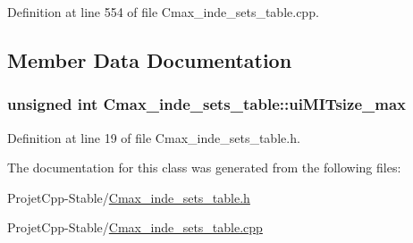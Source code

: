 Definition at line 554 of file Cmax\+\_\+inde\+\_\+sets\+\_\+table.\+cpp.



\subsection{Member Data Documentation}
\hypertarget{class_cmax__inde__sets__table_a9a847269f6dfaca3ce1c292fc31171cf}{}
\subsubsection[{ui\+M\+I\+Tsize\+\_\+max}]{\setlength{\rightskip}{0pt plus 5cm}unsigned int Cmax\+\_\+inde\+\_\+sets\+\_\+table\+::ui\+M\+I\+Tsize\+\_\+max\hspace{0.3cm}{\ttfamily [private]}}\label{class_cmax__inde__sets__table_a9a847269f6dfaca3ce1c292fc31171cf}


Definition at line 19 of file Cmax\+\_\+inde\+\_\+sets\+\_\+table.\+h.



The documentation for this class was generated from the following files\+:\begin{DoxyCompactItemize}
\item 
Projet\+Cpp-\/\+Stable/\hyperlink{_cmax__inde__sets__table_8h}{Cmax\+\_\+inde\+\_\+sets\+\_\+table.\+h}\item 
Projet\+Cpp-\/\+Stable/\hyperlink{_cmax__inde__sets__table_8cpp}{Cmax\+\_\+inde\+\_\+sets\+\_\+table.\+cpp}\end{DoxyCompactItemize}
